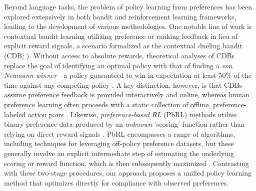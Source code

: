 Beyond language tasks, the problem of policy learning from preferences has been explored extensively in both bandit and reinforcement learning frameworks, leading to the development of various methodologies. One notable line of work is contextual bandit learning utilizing preference or ranking feedback in lieu of explicit reward signals, a scenario formalized as the contextual dueling bandit (CDB; \cite{yue2012karmed,dudik2015contextual}). Without access to absolute rewards, theoretical analyses of CDBs replace the goal of identifying an optimal policy with that of finding a \textit{von Neumann winner}—a policy guaranteed to win in expectation at least 50\% of the time against any competing policy \citep{dudik2015contextual}. A key distinction, however, is that CDBs assume preference feedback is provided interactively and online, whereas human preference learning often proceeds with a static collection of offline, preference-labeled action pairs \citep{yan2022human}. Likewise, \textit{preference-based RL} (PbRL) methods utilize binary preference data produced by an \textit{unknown} 'scoring' function rather than relying on direct reward signals \citep{BusaFekete2014,ruiz2023dueling}. PbRL encompasses a range of algorithms, including techniques for leveraging off-policy preference datasets, but these generally involve an explicit intermediate step of estimating the underlying scoring or reward function, which is then subsequently maximized \citep{jain2013learning,BusaFekete2014,christiano2017deep,sadigh2017active,kupcsik2018learning}. Contrasting with these two-stage procedures, our approach proposes a unified policy learning method that optimizes directly for compliance with observed preferences.

